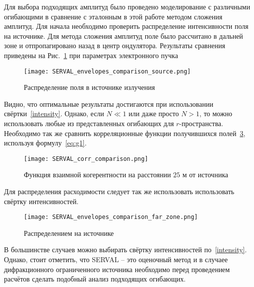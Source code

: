 Для выбора подходящих амплитуд было проведено моделирование с различными огибающими в сравнение с эталонным в этой работе методом сложения амплитуд. Для начала необходимо проверить распределение интенсивности поля на источнике. Для метода сложения амплитуд поле было рассчитано в дальней зоне и отпропагировано назад в центр ондулятора. Результаты сравнения приведены на Рис.~\ref{fig:SERVAL_envelopes_comparison_far_zone} при параметрах электронного пучка 
\begin{figure}[H] 
	\centering 	\texttt{[image: SERVAL\_envelopes\_comparison\_source.png]}
	\caption{Распределение поля в источнике излучения}
	\label{fig:SERVAL_envelopes_comparison_far_zone}
\end{figure}
Видно, что оптимальные результаты достигаются при использовании свёртки~\ref{intensity}. Однако, если $N \ll 1$ или даже просто $N > 1$, то можно использовать любые из представленных огибающих для $r$-пространства. Необходимо так же сравнить корреляционные функции получившихся полей~\ref{fig:diff_coh_incoh_rad}, используя формулу~\ref{eq:g1}.
\begin{figure}[H] 
	\centering 	\texttt{[image: SERVAL\_corr\_comparison.png]}
	\caption{Функция взаимной когерентности на расстоянии $25$ м от источника}
	\label{fig:SERVAL_corr_comparison}
\end{figure}
Для распределения расходимости следует так же использовать использовать свёртку интенсивностей.
\begin{figure}[H] 
	\centering 	\texttt{[image: SERVAL\_envelopes\_comparison\_far\_zone.png]}
	\caption{Распределением на источнике }
	\label{fig:diff_coh_incoh_rad}
\end{figure}
В большинстве случаев можно выбирать свёртку интенсивностей по~\ref{intensity}. Однако, стоит отметить, что SERVAL -- это оценочный метод и в случаее дифракционного ограниченного источника необходимо перед проведением расчётов сделать подобный анализ подходящих огибающих. 

